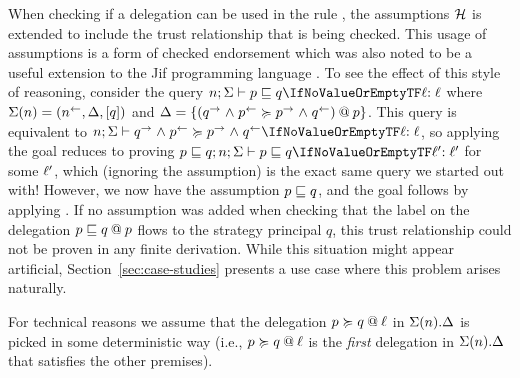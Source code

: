 When checking if a delegation can be used in the rule , the assumptions $\Assumps$ is extended to include the trust relationship that is being checked. This usage of assumptions is a form of checked endorsement which was also noted to be a useful extension to the Jif programming language \cite{Chong:2007:SWA:1294261.1294265}.
To see the effect of this style of reasoning, consider the query $\flowstoquery{n; \env}{p}{q}{\level}$ where $\env(n) = (\integ{n}, \scope, \lbrack q \rbrack)$ and $\scope = \{\lb{p}{(\conf{q} \conj \integ{p} \actsfor \conf{p} \conj \integ{q})} \}$. This query is equivalent to $\actsforquery{n; \env}{\conf{q} \conj \integ{p}}{\conf{p} \conj \integ{q}}{\level}$, so applying  the goal reduces to proving $\flowstoquery{p \flowsto q; n; \env}{p}{q}{\level'}$ for some $\level'$, which (ignoring the assumption) is the exact same query we started out with! However, we now have the assumption $p \flowsto q$, and the goal follows by applying . If no assumption was added when checking that the label on the delegation $\lb{p}{p \flowsto q}$ flows to the strategy principal $q$, this trust relationship could not be proven in any finite derivation. While this situation might appear artificial, Section~\ref{sec:case-studies} presents a use case where this problem arises naturally.

For technical reasons we assume that the delegation $\lb{\level}{p \actsfor q}$ in $\env(n).\scope$ is picked in some deterministic way (i.e., $\lb{\level}{p \actsfor q}$ is the \emph{first} delegation in $\env(n).\scope$ that satisfies the other premises).


